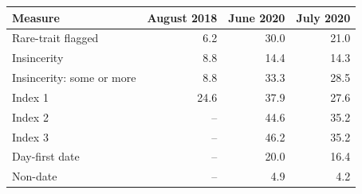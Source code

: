 \begin{tabular}{lrrr}
\toprule
Measure & August 2018 & June 2020 & July 2020 \\
\midrule
Rare-trait flagged & 6.2 & 30.0 & 21.0 \\
Insincerity & 8.8 & 14.4 & 14.3 \\
Insincerity: some or more & 8.8 & 33.3 & 28.5 \\
Index 1 & 24.6 & 37.9 & 27.6 \\
Index 2 & -- & 44.6 & 35.2 \\
Index 3 & -- & 46.2 & 35.2 \\
Day-first date & -- & 20.0 & 16.4 \\
Non-date & -- & 4.9 & 4.2 \\
\bottomrule
\end{tabular}
